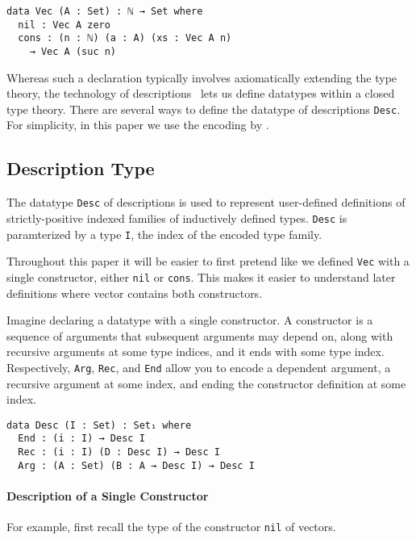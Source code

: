 \documentclass[preprint,nonatbib]{sigplanconf}
\begin{document}
\begin{verbatim}
data Vec (A : Set) : ℕ → Set where
  nil : Vec A zero
  cons : (n : ℕ) (a : A) (xs : Vec A n)
    → Vec A (suc n)
\end{verbatim}

Whereas such a declaration typically involves axiomatically extending
the type theory, the technology of
descriptions~\citep{Chapman:2010:GAL:1932681.1863547,mcbride2010ornamental,dagand:phd}
lets us define datatypes within a closed type theory.
There are
several ways to define the datatype of descriptions {\tt Desc}. 
For simplicity, in this paper we use the encoding by
\citet{mcbride2010ornamental}.

\subsection{Description Type}

The datatype {\tt Desc} of descriptions is used to represent
user-defined definitions of strictly-positive indexed
families of inductively defined types.
{\tt Desc} is paramterized by 
a type {\tt I}, the index of the encoded type family.

Throughout this paper it will be easier to first pretend like we
defined {\tt Vec} with a single constructor, either
{\tt nil} or {\tt cons}. This makes it easier to understand
later definitions where vector contains both constructors.

Imagine declaring a datatype with a single constructor.
A constructor is a sequence of
arguments that subsequent arguments may depend on, along with
recursive arguments at some type indices, and it ends with some type index.
Respectively, {\tt Arg}, {\tt Rec}, and {\tt End} allow you to encode
a dependent argument, a recursive argument at some index, and ending the
constructor definition at some index.

\begin{verbatim}
data Desc (I : Set) : Set₁ where
  End : (i : I) → Desc I
  Rec : (i : I) (D : Desc I) → Desc I
  Arg : (A : Set) (B : A → Desc I) → Desc I
\end{verbatim}

\paragraph{Description of a Single Constructor}

For example, first recall the type of the
constructor {\tt nil} of vectors.
\end{document}
